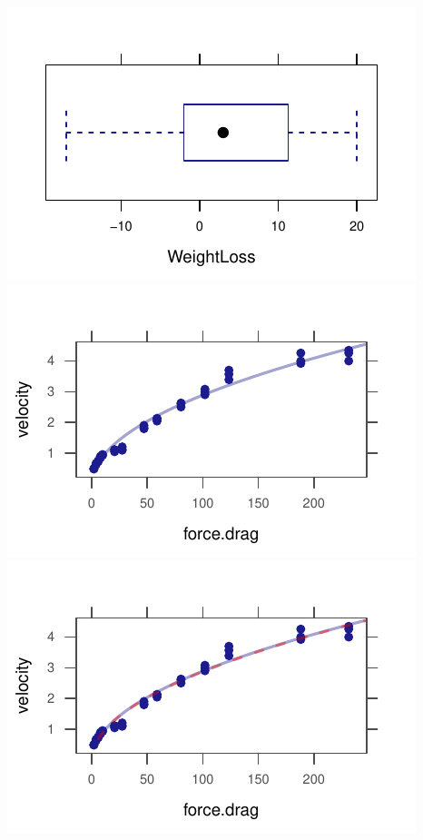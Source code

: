 \documentclass[twoside]{book}\usepackage[]{graphicx}\usepackage[]{xcolor}
\makeatletter
\def\maxwidth{ %
  \ifdim\Gin@nat@width>\linewidth
    \linewidth
  \else
    \Gin@nat@width
  \fi
}
\newenvironment{knitrout}{}{} %
\makeatother
\begin{document}
\begin{solution}
\begin{knitrout}
{\centering \includegraphics[width=\maxwidth]{figures/fig-unnamed-chunk-239-1} 
\includegraphics[width=\maxwidth]{figures/fig-unnamed-chunk-239-2} 
\includegraphics[width=\maxwidth]{figures/fig-unnamed-chunk-239-3} 
}
\end{knitrout}
\end{solution}
\end{document}
